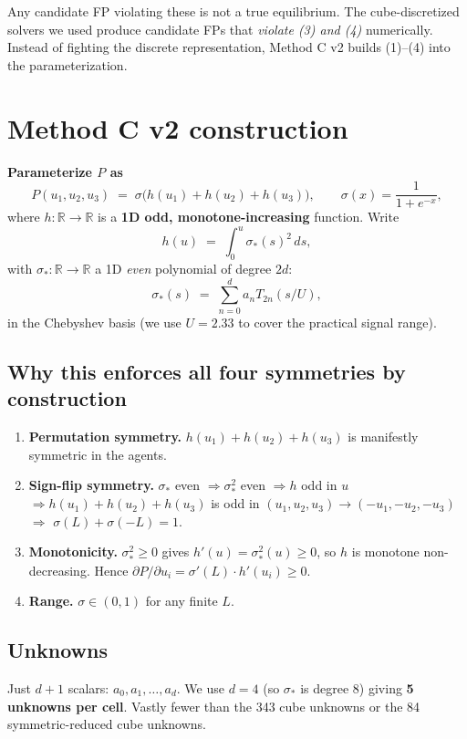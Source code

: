 \documentclass[11pt]{article}
\begin{document}
Any candidate FP violating these is not a true equilibrium. The
cube-discretized solvers we used produce candidate FPs that
\emph{violate (3) and (4)} numerically. Instead of fighting the
discrete representation, Method C v2 builds (1)--(4) into the
parameterization.

\section{Method C v2 construction}

\textbf{Parameterize $P$ as}
\[
P(u_1, u_2, u_3) \;=\; \sigma\!\big( h(u_1) + h(u_2) + h(u_3) \big),
\qquad \sigma(x) = \frac{1}{1+e^{-x}},
\]
where $h: \mathbb{R} \to \mathbb{R}$ is a \textbf{1D odd, monotone-increasing}
function. Write
\[
h(u) \;=\; \int_0^u \sigma_*(s)^2 \, ds,
\]
with $\sigma_*: \mathbb{R} \to \mathbb{R}$ a 1D \emph{even} polynomial of
degree $2 d$:
\[
\sigma_*(s) \;=\; \sum_{n=0}^d a_n T_{2n}(s / U),
\]
in the Chebyshev basis (we use $U = 2.33$ to cover the practical signal
range).

\subsection{Why this enforces all four symmetries by construction}

\begin{enumerate}
  \item \textbf{Permutation symmetry.} $h(u_1) + h(u_2) + h(u_3)$ is
        manifestly symmetric in the agents.
  \item \textbf{Sign-flip symmetry.} $\sigma_*$ even $\Rightarrow \sigma_*^2$
        even $\Rightarrow h$ odd in $u$
        $\Rightarrow h(u_1) + h(u_2) + h(u_3)$ is odd in $(u_1, u_2, u_3) \to
        (-u_1, -u_2, -u_3)$
        $\Rightarrow$ $\sigma(L) + \sigma(-L) = 1$.
  \item \textbf{Monotonicity.} $\sigma_*^2 \geq 0$ gives $h'(u) = \sigma_*^2(u) \geq 0$,
        so $h$ is monotone non-decreasing. Hence
        $\partial P / \partial u_i = \sigma'(L) \cdot h'(u_i) \geq 0$.
  \item \textbf{Range.} $\sigma \in (0, 1)$ for any finite $L$.
\end{enumerate}

\subsection{Unknowns}

Just $d+1$ scalars: $a_0, a_1, \dots, a_d$. We use $d = 4$ (so $\sigma_*$ is
degree 8) giving \textbf{5 unknowns per cell}. Vastly fewer than the
343 cube unknowns or the 84 symmetric-reduced cube unknowns.
\end{document}
